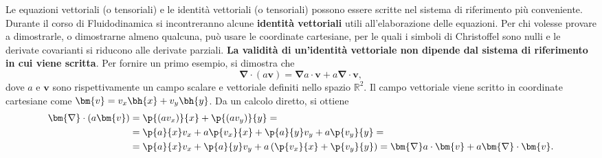 \noindent
\begin{remark}
    Le equazioni vettoriali (o tensoriali) e le identità vettoriali (o tensoriali) possono essere scritte nel sistema di riferimento più conveniente. Durante il corso di Fluidodinamica si incontreranno alcune \textbf{identità vettoriali} utili all'elaborazione delle equazioni. Per chi volesse provare a dimostrarle, o dimostrarne almeno qualcuna, può usare le coordinate cartesiane, per le quali i simboli di Christoffel sono nulli e le derivate covarianti si riducono alle derivate parziali. \textbf{La validità di un'identità vettoriale non dipende dal sistema di riferimento in cui viene scritta}. Per fornire un primo esempio, si dimostra che
 \begin{equation}
  \bm{\nabla} \cdot (a \bm{v}) = \bm{\nabla} a \cdot \bm{v} + a \bm{\nabla} \cdot \bm{v} ,
 \end{equation}
 dove $a$ e $\bm{v}$ sono rispettivamente un campo scalare e vettoriale definiti nello spazio $\mathbb{R}^2$. Il campo vettoriale viene scritto in coordinate cartesiane come $\bm{v} = v_x \bh{x} + v_y \bh{y}$. Da un calcolo diretto, si ottiene
 \begin{equation}
 \begin{aligned}
   \bm{\nabla} \cdot (a \bm{v}) & = \p{(a v_x)}{x} + \p{(a v_y)}{y} = \\
    & = \p{a}{x} v_x + a \p{v_x}{x} + \p{a}{y} v_y + a \p{v_y}{y} = \\
    & = \p{a}{x} v_x + \p{a}{y} v_y + a \left(\p{v_x}{x} + \p{v_y}{y} \right) = 
    \bm{\nabla} a \cdot \bm{v} + a \bm{\nabla} \cdot \bm{v} .
 \end{aligned}
 \end{equation}
\end{remark}


